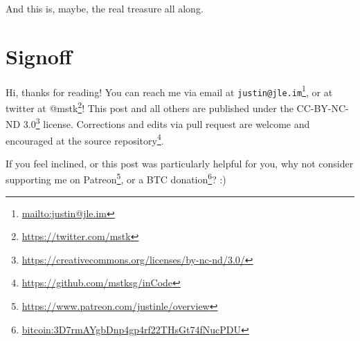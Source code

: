 \documentclass[]{article}
\renewcommand{\href}[2]{#2\footnote{\url{#1}}}
\begin{document}
And this is, maybe, the real treasure all along.

\hypertarget{signoff}{%
\section{Signoff}\label{signoff}}

Hi, thanks for reading! You can reach me via email at
\href{mailto:justin@jle.im}{\nolinkurl{justin@jle.im}}, or at twitter at
\href{https://twitter.com/mstk}{@mstk}! This post and all others are published
under the \href{https://creativecommons.org/licenses/by-nc-nd/3.0/}{CC-BY-NC-ND
3.0} license. Corrections and edits via pull request are welcome and encouraged
at \href{https://github.com/mstksg/inCode}{the source repository}.

If you feel inclined, or this post was particularly helpful for you, why not
consider \href{https://www.patreon.com/justinle/overview}{supporting me on
Patreon}, or a \href{bitcoin:3D7rmAYgbDnp4gp4rf22THsGt74fNucPDU}{BTC donation}?
:)
\end{document}
